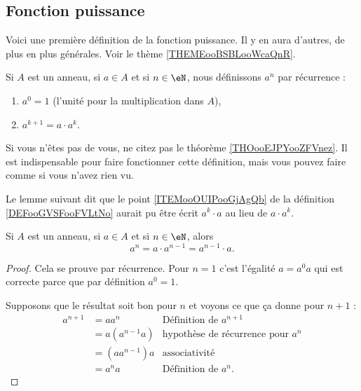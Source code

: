 \subsection{Fonction puissance}

Voici une première définition de la fonction puissance. Il y en aura d'autres, de plus en plus générales. Voir le thème \ref{THEMEooBSBLooWcaQnR}.
\begin{definition}\label{DEFooGVSFooFVLtNo}
	Si \( A\) est un anneau, si \( a\in A\) et si \( n\in \eN\), nous définissons \( a^n\) par récurrence :
	\begin{enumerate}
		\item
		      \( a^0=1\) (l'unité pour la multiplication dans \( A\)),
		\item       \label{ITEMooOUIPooGjAgQb}
		      \( a^{k+1}=a\cdot a^{k}\).
	\end{enumerate}
	Si vous n'êtes pas  de vous, ne citez pas le théorème \ref{THOooEJPYooZFVnez}. Il est indispensable pour faire fonctionner cette définition, mais vous pouvez faire comme si vous n'avez rien vu.
\end{definition}

Le lemme suivant dit que le point \ref{ITEMooOUIPooGjAgQb} de la définition \ref{DEFooGVSFooFVLtNo} aurait pu être écrit \( a^k\cdot a\) au lieu de \( a\cdot a^k\).
\begin{lemma}        \label{LEMooWPARooYLZlzr}
	Si \( A\) est un anneau, si \( a\in A\) et si \( n\in \eN\), alors
	\begin{equation}
		a^n=a\cdot a^{n-1}=a^{n-1}\cdot a.
	\end{equation}
\end{lemma}

\begin{proof}
	Cela se prouve par récurrence. Pour \( n=1\) c'est l'égalité \( a=a^0a\) qui est correcte parce que par définition \( a^0=1\).

	Supposons que le résultat soit bon pour \( n\) et voyons ce que ça donne pour \( n+1\) :
	\begin{subequations}
		\begin{align}
			a^{n+1} & =aa^n        & \text{Définition de } a^{n+1}            \\
			        & =a(a^{n-1}a) & \text{hypothèse de récurrence pour } a^n \\
			        & =(aa^{n-1})a & \text{associativité}                     \\
			        & =a^na        & \text{Définition de } a^n.
		\end{align}
	\end{subequations}
\end{proof}

